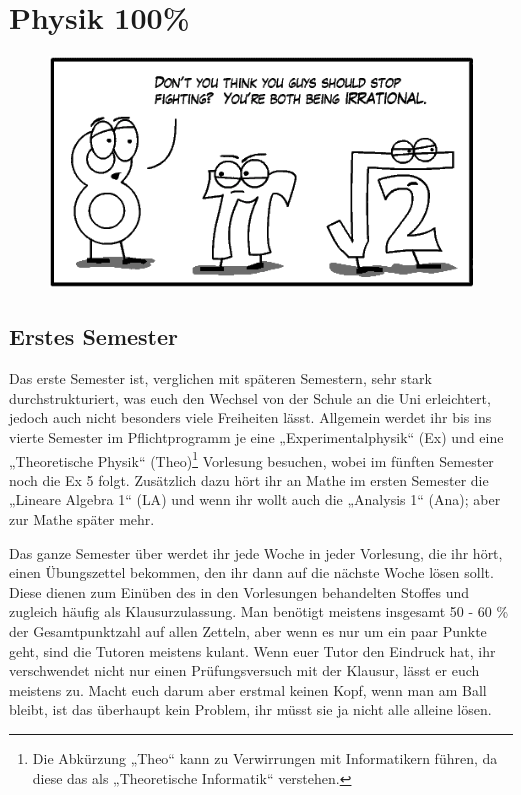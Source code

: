 \section{Physik 100\%}

\begin{figure}[b]
	\centering
	\includegraphics[width=\linewidth]{bilder/both_irrational.png}
\end{figure}

\subsection{Erstes Semester}

Das erste Semester ist, verglichen mit späteren Semestern, sehr stark durchstrukturiert, was euch den Wechsel von der Schule an die Uni erleichtert, jedoch auch nicht besonders viele Freiheiten lässt.  Allgemein werdet ihr bis ins vierte Semester im Pflichtprogramm je eine „Experimentalphysik“ (\gls{Ex}) und eine „Theoretische Physik“ (\gls{Theo})\footnote{Die Abkürzung „Theo“ kann zu Verwirrungen mit Informatikern führen, da diese das als „Theoretische Informatik“ verstehen.} Vorlesung besuchen, wobei im fünften Semester noch die Ex 5 folgt. Zusätzlich dazu hört ihr an Mathe im ersten Semester die „Lineare Algebra 1“ (\gls{LA}) und wenn ihr wollt auch die „Analysis 1“ (\gls{Ana}); aber zur Mathe später mehr.

Das ganze Semester über werdet ihr jede Woche in jeder Vorlesung, die ihr hört, einen Übungszettel bekommen, den ihr dann auf die nächste Woche lösen sollt. Diese dienen zum Einüben des in den Vorlesungen behandelten Stoffes und zugleich häufig als Klausurzulassung. Man benötigt meistens insgesamt 50 - 60 \% der Gesamtpunktzahl auf allen Zetteln, aber wenn es nur um ein paar Punkte geht, sind die Tutoren meistens kulant. Wenn euer Tutor den Eindruck hat, ihr verschwendet nicht nur einen Prüfungsversuch mit der Klausur, lässt er euch meistens zu. Macht euch darum aber erstmal keinen Kopf, wenn man am Ball bleibt, ist das überhaupt kein Problem, ihr müsst sie ja nicht alle alleine lösen.

